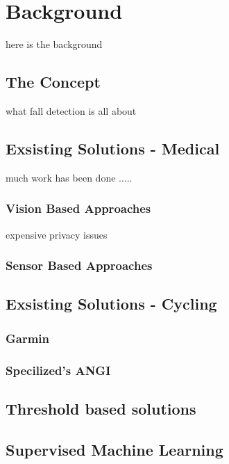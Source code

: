 \chapter{Background}
here is the background

\section{The Concept}

what fall detection is all about 

\section{Exsisting Solutions - Medical}

much work has been done .....

\subsection{Vision Based Approaches}
expensive 
privacy issues

\subsection{Sensor Based Approaches}

\section{Exsisting Solutions - Cycling}

\subsection{Garmin}

\subsection{Specilized's ANGI}

\section{Threshold based solutions}

\section {Supervised Machine Learning}
